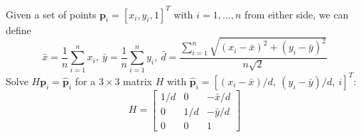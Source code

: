 \documentclass[10pt,landscape]{article}
\begin{document}
\begin{multicols}{3}
Given a set of points $\textbf{p}_i = [x_i, y_i, 1]^T$ with $i = 1, ..., n$ from either side, we can define
\begin{equation*}
    \bar{x} = \frac{1}{n}\sum_{i=1}^nx_i,\ \bar{y} = \frac{1}{n}\sum_{i=1}^ny_i,\ \bar{d} = \frac{\sum_{i=1}^n\sqrt{(x_i - \bar{x})^2 + (y_i - \bar{y})^2 }}{n\sqrt{2}}
\end{equation*}
Solve $H\textbf{p}_i = \hat{\textbf{p}}_i$ for a $3\times3$ matrix $H$ with $\hat{\textbf{p}}_i = [(x_i - \bar{x})/d,\ (y_i - \bar{y})/d,\ i]^T$:
\begin{equation*}
H = \left[ \begin{array}{ccc}
1/d & 0 & -\bar{x}/d \\
0 & 1/d & -\bar{y}/d \\
0 & 0 & 1
\end{array} \right]
\end{equation*}



\end{multicols}
\end{document}
